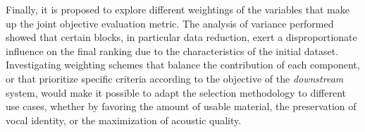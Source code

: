 Finally, it is proposed to explore different weightings of the variables that make up the joint objective evaluation metric. The analysis of variance performed showed that certain blocks, in particular data reduction, exert a disproportionate influence on the final ranking due to the characteristics of the initial dataset. Investigating weighting schemes that balance the contribution of each component, or that prioritize specific criteria according to the objective of the \textit{downstream} system, would make it possible to adapt the selection methodology to different use cases, whether by favoring the amount of usable material, the preservation of vocal identity, or the maximization of acoustic quality.
